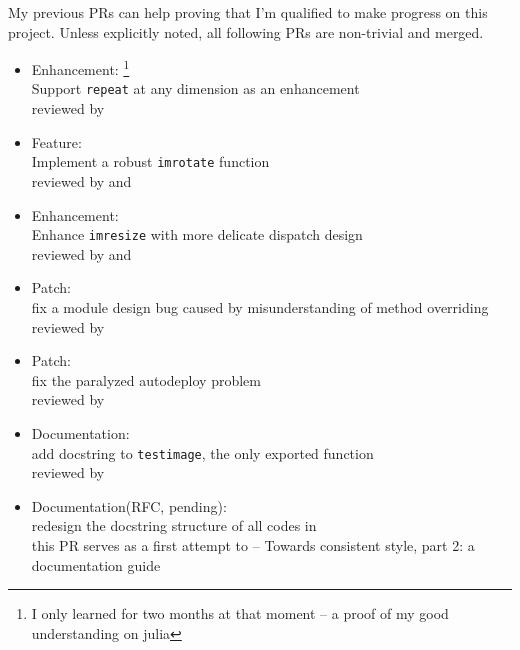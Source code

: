 My previous PRs can help proving that I'm qualified to make progress on this project. Unless explicitly noted, all following PRs are non-trivial and merged.
\begin{itemize}
    \item Enhancement: \footnote{I only learned \langjulia{} for two months at that moment -- a proof of my good understanding on julia}\\
      {\small
      Support \texttt{repeat} at any dimension as an enhancement\\
      reviewed by \mbauman
      }
    \item Feature: \\
      {\small
      Implement a robust \texttt{imrotate} function\\
      reviewed by \evizero and \timholy
      }
    \item Enhancement: \\
      {\small
      Enhance \texttt{imresize} with more delicate dispatch design\\
      reviewed by \evizero and \timholy
      }
    \item Patch: \\
      {\small
      fix a module design bug caused by misunderstanding of method overriding\\
      reviewed by \julio
      }
    \item Patch:  \\
      {\small
      fix the paralyzed autodeploy problem\\
      reviewed by \evizero
      }
    \item Documentation: \\
      {\small
      add docstring to \texttt{testimage}, the only exported function\\
      reviewed by \timholy
      }
    \item Documentation(RFC, pending): \\
      {\small
      redesign the docstring structure of all codes in \imagebinarization\\
      this PR serves as a first attempt to  -- Towards consistent style, part 2: a documentation guide\\
}
\end{itemize}
